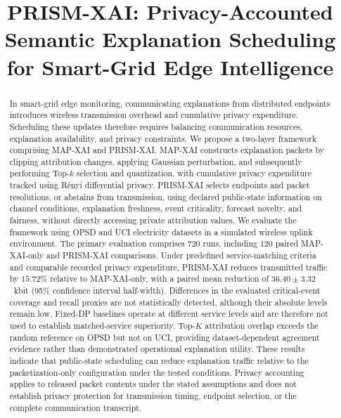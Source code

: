 \documentclass[conference]{IEEEtran}
\begin{document}
\title{PRISM-XAI: Privacy-Accounted Semantic Explanation Scheduling for Smart-Grid Edge Intelligence}
\author{}

\maketitle


\begin{abstract}
In smart-grid edge monitoring, communicating
explanations from distributed endpoints introduces
wireless transmission overhead and cumulative
privacy expenditure. Scheduling these updates
therefore requires balancing communication resources,
explanation availability, and privacy constraints.
We propose a two-layer framework comprising
MAP-XAI and PRISM-XAI. MAP-XAI constructs
explanation packets by clipping attribution
changes, applying Gaussian perturbation, and
subsequently performing Top-$k$ selection and
quantization, with cumulative privacy expenditure
tracked using R\'enyi differential privacy.
PRISM-XAI selects endpoints and packet resolutions,
or abstains from transmission, using declared
public-state information on channel conditions,
explanation freshness, event criticality, forecast
novelty, and fairness, without directly accessing
private attribution values.
We evaluate the framework using OPSD and UCI
electricity datasets in a simulated wireless
uplink environment. The primary evaluation
comprises 720 runs, including 120 paired
MAP-XAI-only and PRISM-XAI comparisons.
Under predefined service-matching criteria
and comparable recorded privacy expenditure,
PRISM-XAI reduces transmitted traffic by
$15.72\%$ relative to MAP-XAI-only, with a
paired mean reduction of $36.40\pm3.32$~kbit
(95\% confidence interval half-width).
Differences in the evaluated critical-event
coverage and recall proxies are not
statistically detected, although their
absolute levels remain low. Fixed-DP baselines
operate at different service levels and are
therefore not used to establish matched-service
superiority. Top-$K$ attribution overlap exceeds
the random reference on OPSD but not on UCI,
providing dataset-dependent agreement evidence
rather than demonstrated operational explanation
utility. These results indicate that public-state
scheduling can reduce explanation traffic
relative to the packetization-only configuration
under the tested conditions. Privacy accounting
applies to released packet contents under the
stated assumptions and does not establish
privacy protection for transmission timing,
endpoint selection, or the complete communication
transcript.
\end{abstract}
\end{document}
